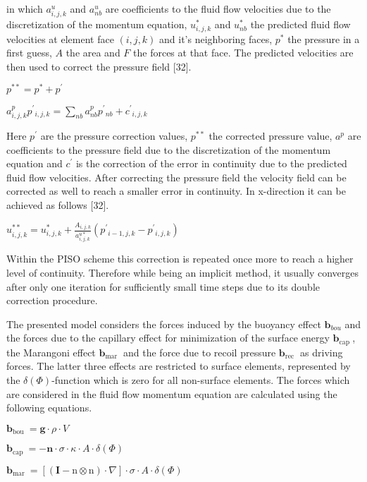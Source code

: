 \documentclass[10pt]{article}
\begin{document}
in which $a_{i, j, k}^{u}$ and $a_{n b}^{u}$ are coefficients to the fluid flow velocities due to the discretization of the momentum equation, $u_{i, j, k}^{*}$ and $u_{n b}^{*}$ the predicted fluid flow velocities at element face $(i, j, k)$ and it's neighboring faces, $p^{*}$ the pressure in a first guess, $A$ the area and $F$ the forces at that face. The predicted velocities are then used to correct the pressure field [32].

$p^{* *}=p^{*}+p^{\prime}$

$a_{i, j, k}^{p} p^{\prime}{ }_{i, j, k}=\sum_{n b} a_{n b}^{p} p^{\prime}{ }_{n b}+c^{\prime}{ }_{i, j, k}$

Here $p^{\prime}$ are the pressure correction values, $p^{* *}$ the corrected pressure value, $a^{p}$ are coefficients to the pressure field due to the discretization of the momentum equation and $c^{\prime}$ is the correction of the error in continuity due to the predicted fluid flow velocities. After correcting the pressure field the velocity field can be corrected as well to reach a smaller error in continuity. In x-direction it can be achieved as follows [32].

$u_{i, j, k}^{* *}=u_{i, j, k}^{*}+\frac{A_{i, j, k}}{a_{i, j, k}^{u *}}\left(p^{\prime}{ }_{i-1, j, k}-p^{\prime}{ }_{i, j, k}\right)$

Within the PISO scheme this correction is repeated once more to reach a higher level of continuity. Therefore while being an implicit method, it usually converges after only one iteration for sufficiently small time steps due to its double correction procedure.

The presented model considers the forces induced by the buoyancy effect $\mathbf{b}_{b o u}$ and the forces due to the capillary effect for minimization of the surface energy $\mathbf{b}_{\text {cap }}$, the Marangoni effect $\mathbf{b}_{\text {mar }}$ and the force due to recoil pressure $\mathbf{b}_{\text {rec }}$ as driving forces. The latter three effects are restricted to surface elements, represented by the $\delta(\Phi)$-function which is zero for all non-surface elements. The forces which are considered in the fluid flow momentum equation are calculated using the following equations.

$\mathbf{b}_{\text {bou }}=\mathbf{g} \cdot \rho \cdot V$

$\mathbf{b}_{\text {cap }}=-\mathbf{n} \cdot \sigma \cdot \kappa \cdot A \cdot \delta(\Phi)$

$\mathbf{b}_{\text {mar }}=[(\mathbf{I}-\mathrm{n} \otimes \mathrm{n}) \cdot \nabla] \cdot \sigma \cdot A \cdot \delta(\Phi)$
\end{document}
